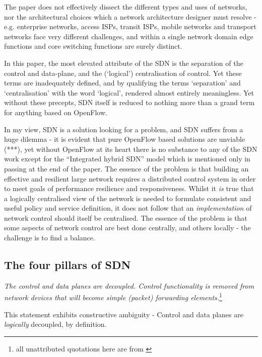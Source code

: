 The paper does not effectively dissect the different types and uses of networks, nor the architectural choices which a network architecture designer must resolve - e.g. enterprise networks, access ISPs, transit ISPs, mobile networks and transport networks face very different challenges, and within a single network domain edge functions and core switching functions are surely distinct.

In this paper, the most elevated attribute of the SDN is the separation of the control and data-plane, and the (‘logical’) centralisation of control.
Yet these terms are inadequately defined, and by qualifying the terms ‘separation’ and ‘centralisation’ with the word ‘logical’, rendered almost entirely meaningless.
Yet without these precepts, SDN itself is reduced to nothing more than a grand term for anything based on OpenFlow.

In my view, SDN is a solution looking for a problem, and SDN suffers from a huge dilemma - it is evident that pure OpenFlow based solutions are unviable (***), yet without OpenFlow at its heart there is no substance to any of the SDN work except for the “Integrated hybrid SDN” model which is mentioned only in passing at the end of the paper.
The essence of the problem is that building an effective and resilient large network requires a distributed control system in order to meet goals of performance resilience and responsiveness.
Whilst it \textit{is} true that a logically centralised view of the network is needed to formulate consistent and useful policy and service definition, it does not follow that an \textit{implementation} of network control should itself be centralised.
The essence of the problem is that some aspects of network control are best done centrally, and others locally - the challenge is to find a balance.

\subsection{The four pillars of SDN}

\textit{The control and data planes are decoupled. Control functionality is removed from network devices that will become simple (packet) forwarding elements.}\footnote{all unattributed quotations here are from \cite{Kreutz2015}}

This statement exhibits constructive ambiguity - 
Control and data planes are \textit{logically} decoupled, by definition.

